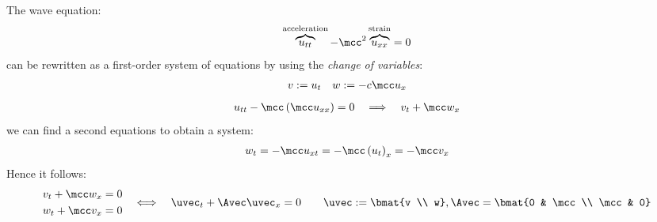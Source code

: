 \begin{examplebox}\nospacing
    \begin{example}\label{example:wave_equation}
        The wave equation:
        \begin{align*}
          \overbrace{u_{tt}}^{\text{acceleration}}-\mcc^{2}\overbrace{u_{xx}}^{\text{strain}}=0
        \end{align*}
        can be rewritten as a first-order system of equations by using the \textit{change of variables}:
        \begin{align*}
          v:=u_{t}&&w:=-c\mcc u_{x}
        \end{align*}
        \begin{align*}
         u_{tt}-\mcc\left(\mcc u_{xx}\right)=0&&\implies&&v_{t}+\mcc w_{x}
        \end{align*}
        we can find a second equations to obtain a system:
        \begin{align*}
          w_{t}=-\mcc u_{xt}=-\mcc \left(u_{t}\right)_{x}=-\mcc v_{x}
        \end{align*}
        Hence it follows:
        \begin{alignat}{4}
          \begin{aligned}
            v_{t}+\mcc w_{x}&=0\\
            w_{t}+\mcc v_{x}&=0
          \end{aligned}&&\iff&& \uvec_{t}+\Avec\uvec_{x}=0&\quad&\uvec:=\bmat{v \\ w},\Avec=\bmat{0 & \mcc\\ \mcc & 0}
        \end{alignat}
    \end{example}
\end{examplebox}
\begin{examplebox}\nospacing
    \begin{example}\label{example:linearized_euler_equations}
    \end{example}
\end{examplebox}
